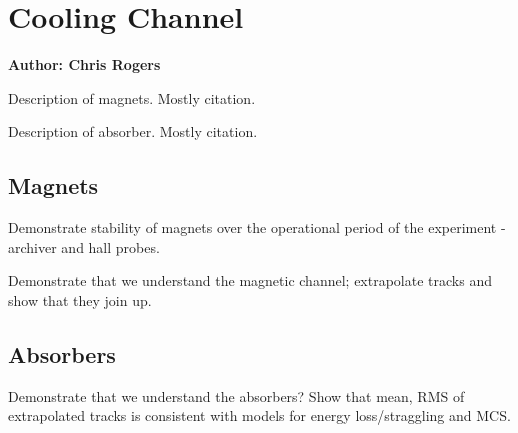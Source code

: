 \section{Cooling Channel}
\label{Sect:CoolingChannel}

\textbf{Author: Chris Rogers}

Description of magnets. Mostly citation. 

Description of absorber. Mostly citation.

\subsection{Magnets}

Demonstrate stability of magnets over the operational period of the experiment -
archiver and hall probes.

Demonstrate that we understand the magnetic channel; extrapolate tracks and 
show that they join up.

\subsection{Absorbers}

Demonstrate that we understand the absorbers? Show that mean, RMS of extrapolated 
tracks is consistent with models for energy loss/straggling and MCS.

